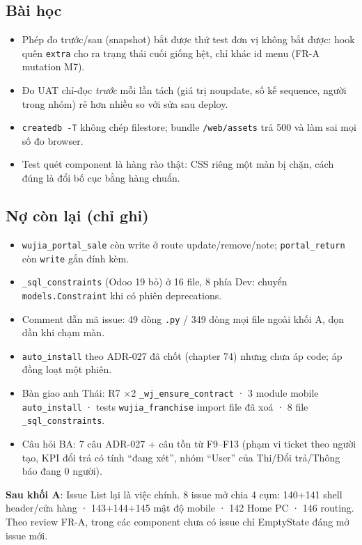 \subsection*{Bài học}
\begin{itemize}[nosep]
\item Phép đo trước/sau (snapshot) bắt được thứ test đơn vị không bắt được: hook quên \texttt{extra} cho ra trạng thái
  cuối giống hệt, chỉ khác id menu (FR-A mutation M7).
\item Đo UAT chỉ-đọc \emph{trước} mỗi lần tách (giá trị noupdate, số kế sequence, người trong nhóm) rẻ hơn nhiều so với
  sửa sau deploy.
\item \texttt{createdb -T} không chép filestore; bundle \texttt{/web/assets} trả 500 và làm sai mọi số đo browser.
\item Test quét component là hàng rào thật: CSS riêng một màn bị chặn, cách đúng là đổi bố cục bằng hàng chuẩn.
\end{itemize}

\subsection*{Nợ còn lại (chỉ ghi)}
\begin{itemize}[nosep]
\item \texttt{wujia\_portal\_sale} còn write ở route update/remove/note; \texttt{portal\_return} còn \texttt{write} gắn đính kèm.
\item \texttt{\_sql\_constraints} (Odoo 19 bỏ) ở 16 file, 8 phía Dev: chuyển \texttt{models.Constraint} khi có phiên deprecations.
\item Comment dẫn mã issue: 49 dòng \texttt{.py} / 349 dòng mọi file ngoài khối A, dọn dần khi chạm màn.
\item \texttt{auto\_install} theo ADR-027 đã chốt (chapter 74) nhưng chưa áp code; áp đồng loạt một phiên.
\item Bàn giao anh Thái: R7 $\times$2 \texttt{\_wj\_ensure\_contract} · 3 module mobile \texttt{auto\_install} · tests
  \texttt{wujia\_franchise} import file đã xoá · 8 file \texttt{\_sql\_constraints}.
\item Câu hỏi BA: 7 câu ADR-027 + câu tồn từ F9--F13 (phạm vi ticket theo người tạo, KPI đổi trả có tính ``đang xét'',
  nhóm ``User'' của Thi/Đổi trả/Thông báo đang 0 người).
\end{itemize}

\textbf{Sau khối A}: Issue List lại là việc chính. 8 issue mở chia 4 cụm: 140+141 shell header/cửa hàng · 143+144+145
mật độ mobile · 142 Home PC · 146 routing. Theo review FR-A, trong các component chưa có issue chỉ EmptyState đáng mở
issue mới.
